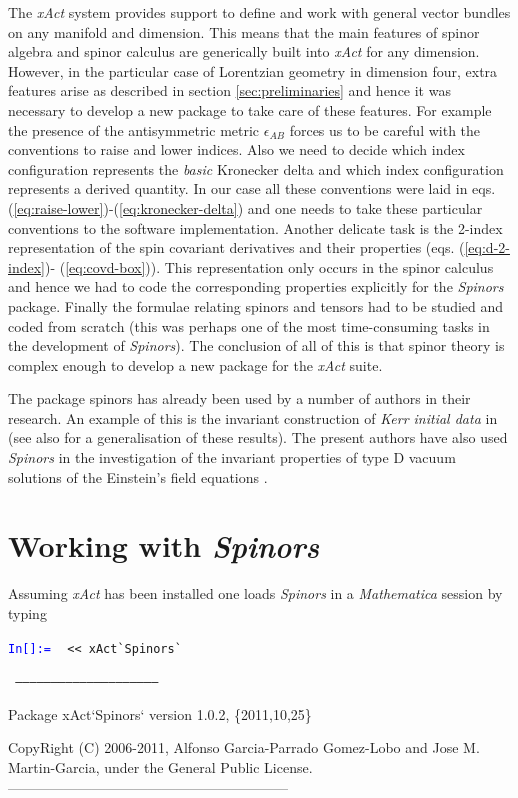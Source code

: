 \documentclass[final,3p,times,twocolumn]{elsarticle}
\newcounter{mathex}
\newcommand{\Mathsize}{\scriptsize}
\newcommand{\MathIn}[2]{ {\textcolor{blue}{\tt In[\arabic{#1}]:=} }\ { \tt #2 } \\[1mm] }
\begin{document}
The {\em xAct} system provides support to define and work with general vector bundles
on any manifold and dimension. This means that the main features of spinor algebra
and spinor calculus are generically built into {\em xAct} for any dimension. However, in the
particular case of Lorentzian geometry in dimension four, extra features arise as described in section
\ref{sec:preliminaries} and hence it was necessary to develop a new package to take care 
of these features. For example the presence of the antisymmetric metric $\epsilon_{AB}$
forces us to be careful with the conventions to raise and lower indices. Also 
we need to decide which index configuration represents the {\em basic} Kronecker delta and 
which index configuration represents a derived quantity. In our case all these conventions were
laid in eqs. (\ref{eq:raise-lower})-(\ref{eq:kronecker-delta}) and one needs to take these 
particular conventions to the software implementation.  Another delicate task is the 2-index
representation of the spin covariant derivatives and their properties (eqs. (\ref{eq:d-2-index})-
(\ref{eq:covd-box})). This representation only occurs in the spinor calculus and hence we had to code 
the corresponding properties explicitly for the {\em Spinors} package. Finally the formulae relating spinors and 
tensors had to be studied and coded from scratch 
(this was perhaps one of the most time-consuming 
tasks in the development of {\em Spinors}). The conclusion of all of this is that spinor theory 
is complex enough to develop a new package for the {\em xAct} suite. 

The package spinors has already been used by a number of authors in their research. 
An example of this is the invariant construction of {\em Kerr initial data} in 
\cite{KERR-INVARIANT-TJ,KERR-INVARIANT-PRL} (see also \cite{KERR-INVARIANT-PRS} for a generalisation
of these results). The present authors have also used {\em Spinors} in the investigation of 
the invariant properties of type D vacuum solutions of the Einstein's field equations \cite{EDGAR-D}. 

\section{Working with {\em Spinors}}
\label{sec:spinors-description}
Assuming {\em xAct} has been installed one 
loads {\em Spinors} in a {\em Mathematica} session by typing 

\begin{flushleft}
\Mathsize
{}
\MathIn{mathex}{<< xAct\`{}Spinors\`{}} 
{\tt 
------------------------------------------------------------

Package xAct`Spinors`  version 1.0.2, \{2011,10,25\}

CopyRight (C) 2006-2011, Alfonso Garcia-Parrado Gomez-Lobo and Jose M. Martin-Garcia, under the General Public License.
------------------------------------------------------------
}
\end{flushleft}
\end{document}
